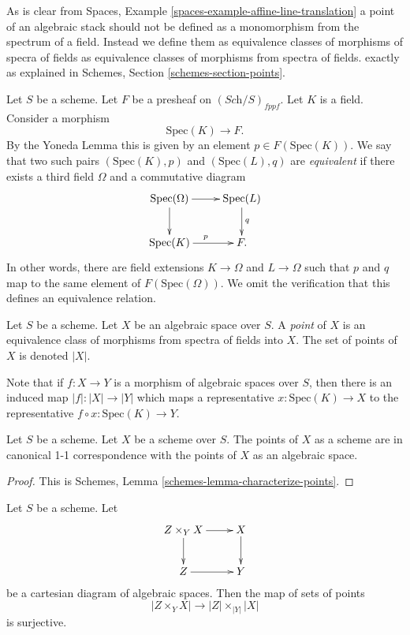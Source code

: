 \noindent
As is clear from Spaces, Example \ref{spaces-example-affine-line-translation}
a point of an algebraic stack should not be defined as a monomorphism
from the spectrum of a field.
Instead we define them as equivalence classes of morphisms of specra
of fields as equivalence classes of morphisms from spectra of fields.
exactly as explained in Schemes, Section \ref{schemes-section-points}.

\medskip\noindent
Let $S$ be a scheme.
Let $F$ be a presheaf on $(\textit{Sch}/S)_{fppf}$.
Let $K$ is a field. Consider a morphism
$$
\text{Spec}(K) \longrightarrow F.
$$
By the Yoneda Lemma this is given by an
element $p \in F(\text{Spec}(K))$. We say that two such
pairs $(\text{Spec}(K), p)$ and $(\text{Spec}(L), q)$
are {\it equivalent} if there exists
a third field $\Omega$ and a commutative diagram
$$
\xymatrix{
\text{Spec}(\Omega) \ar[r] \ar[d] &
\text{Spec}(L) \ar[d]^q \\
\text{Spec}(K) \ar[r]^p &
F.
}
$$
In other words, there are field extensions
$K \to \Omega$ and $L \to \Omega$ such that
$p$ and $q$ map to the same element
of $F(\text{Spec}(\Omega))$. We omit the verification that this
defines an equivalence relation.

\begin{definition}
\label{definition-points}
Let $S$ be a scheme. Let $X$ be an algebraic space over $S$.
A {\it point} of $X$ is an equivalence class of morphisms
from spectra of fields into $X$.
The set of points of $X$ is denoted $|X|$.
\end{definition}

\noindent
Note that if $f : X \to Y$ is a morphism of algebraic spaces
over $S$, then there is an induced map $|f| : |X| \to |Y|$ which
maps a representative $x : \text{Spec}(K) \to X$ to the representative
$f \circ x : \text{Spec}(K) \to Y$.

\begin{lemma}
\label{lemma-scheme-points}
Let $S$ be a scheme. Let $X$ be a scheme over $S$.
The points of $X$ as a scheme are in canonical 1-1 correspondence
with the points of $X$ as an algebraic space.
\end{lemma}

\begin{proof}
This is Schemes, Lemma \ref{schemes-lemma-characterize-points}.
\end{proof}

\begin{lemma}
\label{lemma-points-cartesian}
Let $S$ be a scheme. Let
$$
\xymatrix{
Z \times_Y X \ar[r] \ar[d] & X \ar[d] \\
Z \ar[r] & Y
}
$$
be a cartesian diagram of algebraic spaces. Then the map of sets
of points
$$
|Z \times_Y X|
\longrightarrow
|Z| \times_{|Y|} |X|
$$
is surjective.
\end{lemma}

